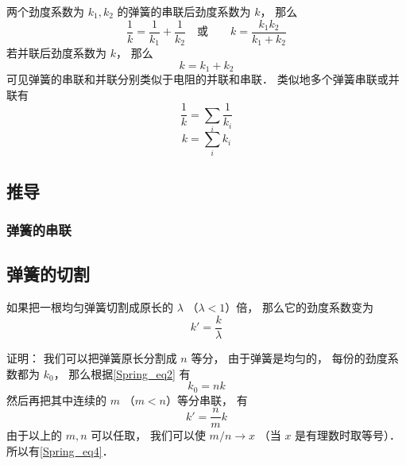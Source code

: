 
\begin{issues}
\issueDraft
\end{issues}


两个劲度系数为 $k_1, k_2$ 的弹簧的串联后劲度系数为 $k$， 那么
\begin{equation}
\frac{1}{k} = \frac{1}{k_1} + \frac{1}{k_2}
\quad \text{或} \qquad
k = \frac{k_1 k_2}{k_1 + k_2}
\end{equation}
若并联后劲度系数为 $k$， 那么
\begin{equation}
k = k_1 + k_2
\end{equation}
可见弹簧的串联和并联分别类似于电阻的并联和串联． 类似地多个弹簧串联或并联有
\begin{equation}\label{Spring_eq2}
\frac{1}{k} = \sum_i \frac{1}{k_i}
\end{equation}
\begin{equation}\label{Spring_eq3}
k = \sum_i k_i
\end{equation}

\subsection{推导}
\subsubsection{弹簧的串联}

\subsection{弹簧的切割}
如果把一根均匀弹簧切割成原长的 $\lambda$ （$\lambda < 1$）倍， 那么它的劲度系数变为
\begin{equation}\label{Spring_eq4}
k' = \frac{k}{\lambda}
\end{equation}

证明： 我们可以把弹簧原长分割成 $n$ 等分， 由于弹簧是均匀的， 每份的劲度系数都为 $k_0$， 那么根据\autoref{Spring_eq2} 有
\begin{equation}
k_0 = nk
\end{equation}
然后再把其中连续的 $m$ （$m < n$）等分串联， 有
\begin{equation}
k' = \frac{n}{m}k
\end{equation}
由于以上的 $m, n$ 可以任取， 我们可以使 $m/n \to x$ （当 $x$ 是有理数时取等号）．所以有\autoref{Spring_eq4}．

